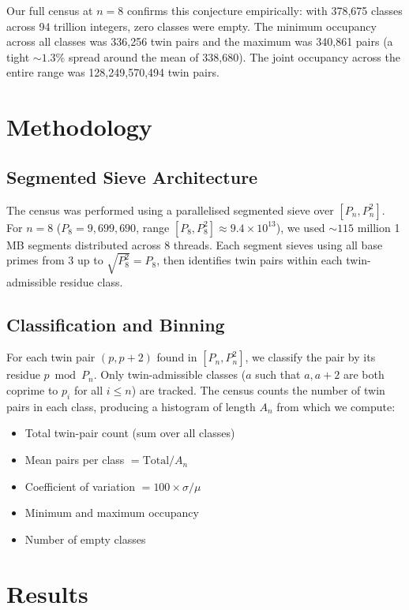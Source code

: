 \documentclass[11pt]{article}
\begin{document}
\noindent Our full census at $n=8$ confirms this conjecture empirically: with 378{,}675 classes across 94 trillion integers, zero classes were empty. The minimum occupancy across all classes was 336{,}256 twin pairs and the maximum was 340{,}861 pairs (a tight $\sim 1.3\%$ spread around the mean of 338{,}680). The joint occupancy across the entire range was 128{,}249{,}570{,}494 twin pairs.

\section{Methodology}

\subsection{Segmented Sieve Architecture}

The census was performed using a parallelised segmented sieve over $[P_n, P_n^2]$. For $n=8$ ($P_8 = 9{,}699{,}690$, range $[P_8, P_8^2] \approx 9.4 \times 10^{13}$), we used $\sim 115$ million 1 MB segments distributed across 8 threads. Each segment sieves using all base primes from 3 up to $\sqrt{P_8^2} = P_8$, then identifies twin pairs within each twin-admissible residue class.

\subsection{Classification and Binning}

For each twin pair $(p, p+2)$ found in $[P_n, P_n^2]$, we classify the pair by its residue $p \bmod P_n$. Only twin-admissible classes ($a$ such that $a, a+2$ are both coprime to $p_i$ for all $i \leq n$) are tracked. The census counts the number of twin pairs in each class, producing a histogram of length $A_n$ from which we compute:
\begin{itemize}
  \item Total twin-pair count (sum over all classes)
  \item Mean pairs per class $= \text{Total} / A_n$
  \item Coefficient of variation $= 100 \times \sigma / \mu$
  \item Minimum and maximum occupancy
  \item Number of empty classes
\end{itemize}

\section{Results}
\label{sec:results}
\end{document}
